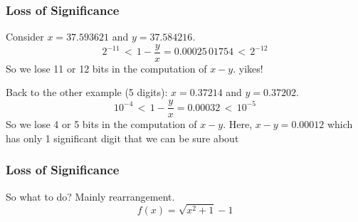 \documentclass[10pt]{beamer}
\begin{document}
\begin{frame}
\frametitle{Loss of Significance}
\begin{example}
  Consider $x=37.593621$ and $y=37.584216$.
\begin{equation*}
  2^{-11} \,<\, 1-\frac{y}{x} = 0.00025\,01754 \,<\, 2^{-12}
\end{equation*}
So we lose 11 or 12 bits in the computation of $x-y$.  yikes!
\end{example}
\begin{example}
Back to the other example (5 digits): $x = 0.37214$ and
  $y = 0.37202$.  
\begin{equation*}
  10^{-4} \,<\, 1-\frac{y}{x} = 0.00032 \,<\, 10^{-5}
\end{equation*}
So we lose 4 or 5 bits in the computation of $x-y$.
\bigskip
Here, $x-y=0.00012$ which has only 1 significant digit that we can be
sure about
\end{example}
\end{frame}
\begin{frame}
\frametitle{Loss of Significance}
So what to do?  Mainly rearrangement.
\begin{equation*}
  f(x) = \sqrt{x^2 + 1} - 1
\end{equation*}

\end{frame}
\end{document}
